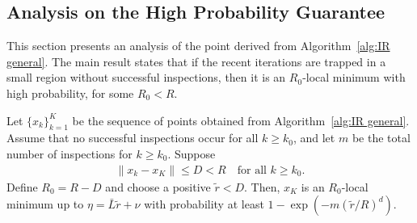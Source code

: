 \subsection{Analysis on the High Probability Guarantee}
This section presents an analysis of the point derived from Algorithm~\ref{alg:IR general}.
The main result states that if the recent iterations are trapped in a small region without successful inspections, then it is an $R_0$-local minimum with high probability, for some $R_0 < R$.

\begin{theorem} \label{thm: high prob guarantee of an approx. R-local min}
    Let $\{x_k\}_{k=1}^{K}$ be the sequence of points obtained from Algorithm~\ref{alg:IR general}. Assume that no successful inspections occur for all $k \geq k_0$, and let $m$ be the total number of inspections for $k \geq k_0$. Suppose
    \begin{align*}
        \|x_{k} - x_K\| \leq D < R \quad \text{for all } k \geq k_0.
    \end{align*}
    Define $R_0 = R-D$ and choose a positive $\tilde{r} < D$. Then, $x_K$ is an $R_0$-local minimum up to $\eta = \bar{L}\tilde{r} + \nu$ with probability at least $1-\exp(- m (\tilde{r}/R)^d)$.
\end{theorem}
